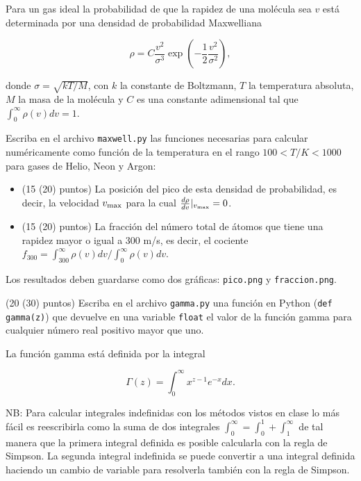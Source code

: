 \documentclass[11pt,letterpaper]{exam}
\begin{document}
\begin{questions}

Para un gas ideal la probabilidad de que la rapidez de una mol\'ecula
sea $v$ est\'a determinada por una densidad de probabilidad
Maxwelliana  

\begin{equation}
\rho = C\frac{v^2}{\sigma^3}\exp{\left(-\frac{1}{2}\frac{v^2}{\sigma^2}\right)}, 
\end{equation}

donde $\sigma=\sqrt{kT/M}$, con $k$ la constante de Boltzmann, $T$ la
temperatura absoluta, $M$ la masa de la mol\'ecula y $C$ es una
constante adimensional tal que $\int_{0}^{\infty}\rho(v)dv=1$.


Escriba en el archivo \verb"maxwell.py" las funciones necesarias para
calcular num\'ericamente como funci\'on de la temperatura en el rango
$100<T/K<1000$ para gases de Helio, Neon y Argon:  
\begin{itemize}
\item (15 (20) puntos) La posici\'on del pico de esta densidad de probabilidad, es
  decir, la velocidad $v_{\rm max}$ para la cual $\frac{d \rho}{dv}|_{v_{\rm max}}=0$.
\item (15 (20) puntos) La fracci\'on del n\'umero total de \'atomos que tiene una rapidez mayor o igual a $300$ m/s, es decir, el cociente $f_{300} =
  \int_{300}^{\infty}\rho(v)dv/\int_0^{\infty}\rho(v)dv$.
\end{itemize}
Los resultados deben guardarse como dos gr\'aficas: \verb"pico.png" y
\verb"fraccion.png". 




(20 (30) puntos) Escriba en el archivo \verb"gamma.py" una funci\'on en Python
(\verb"def gamma(z)") que devuelve en una variable \verb"float" el
valor de la funci\'on gamma para cualquier n\'umero real positivo
mayor que uno.  

La funci\'on gamma est\'a definida por la integral

\begin{equation}
\Gamma(z) = \int_{0}^{\infty}x^{z-1}e^{-x}dx.
\end{equation}


\end{questions}

\noindent
NB: Para calcular integrales indefinidas con los m\'etodos vistos en
clase lo m\'as  f\'acil es reescribirla como la suma de dos integrales
$\int_0^{\infty} = \int_{0}^{1} + \int_{1}^{\infty}$ de tal manera que
la primera integral definida es posible calcularla con la regla de
Simpson. La segunda integral indefinida se puede convertir a una
integral definida haciendo un cambio de variable para resolverla
tambi\'en con la regla de Simpson.  
\end{document}
